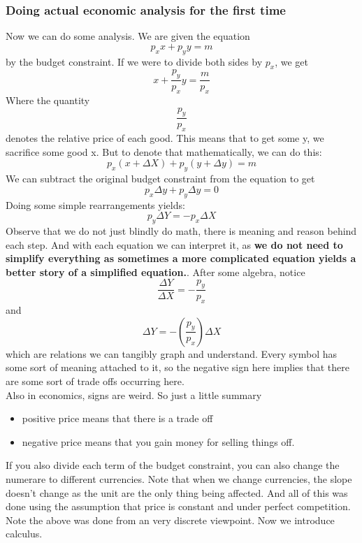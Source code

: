 \documentclass{article}
\begin{document}
\subsubsection{Doing actual economic analysis for the first time}
Now we can do some analysis. We are given the equation
\[
p_x x + p_y y = m
\]
by the budget constraint. If we were to divide both sides by $p_x$, we get 
\[
x + \frac{p_y}{p_x} y = \frac{m}{p_x}
\]
Where the quantity
\[
\frac{p_y}{p_x}
\]
denotes the relative price of each good. This means that to get some y, we sacrifice some good x. But to denote that mathematically, we can do this:
\[
p_x(x + \Delta X) + p_y(y + \Delta y) = m
\]
We can subtract the original budget constraint from the equation to get 
\[
p_x \Delta y + p_y \Delta y = 0
\]
Doing some simple rearrangements yields:
\[
p_y \Delta Y = -p_x \Delta X
\]
Observe that we do not just blindly do math, there is meaning and reason behind each step. And with each equation we can interpret it, as \textbf{we do not need to simplify everything as sometimes a more complicated equation yields a better story of a simplified equation.}. After some algebra, notice
\[
\frac{\Delta Y}{\Delta X} = -\frac{p_y}{p_x}
\]
and 
\[
\Delta Y = -(\frac{p_y}{p_x})\Delta X
\]
which are relations we can tangibly graph and understand. Every symbol has some sort of meaning attached to it, so the negative sign here implies that there are some sort of trade offs occurring here. \\


Also in economics, signs are weird. So just a little summary 
\begin{itemize}
    \item positive price means that there is a trade off
    \item negative price means that you gain money for selling things off. 
\end{itemize}
If you also divide each term of the budget constraint, you can also change the numerare to different currencies. Note that when we change currencies, the slope doesn't change as the unit are the only thing being affected. And all of this was done using the assumption that price is constant and under perfect competition. \\


Note the above was done from an very discrete viewpoint. Now we introduce calculus. 
\end{document}

